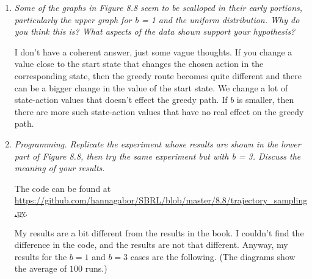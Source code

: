 \documentclass[12pt,a4paper]{article}
\begin{document}
\begin{enumerate}
  \item 
    \textit{Some of the graphs in Figure 8.8 seem to be scalloped in their early portions,
    particularly the upper graph for b = 1 and the uniform distribution. Why do you think
    this is? What aspects of the data shown support your hypothesis?}

    I don't have a coherent answer, just some vague thoughts. If you change a value close to
    the start state that changes the chosen action in the corresponding state, then the greedy
    route becomes quite different and there can be a bigger change in the value of the start
    state. We change a lot of state-action values that doesn't effect the greedy path. If $b$
    is smaller, then there are more such state-action values that have no real effect on the
    greedy path.

  \item
    \textit{Programming. Replicate the experiment whose results are shown in the
    lower part of Figure 8.8, then try the same experiment but with b = 3. Discuss the
    meaning of your results.}

    The code can be found at \url{https://github.com/hannagabor/SBRL/blob/master/8.8/trajectory_sampling.py}.


    My results are a bit different from the results in the book. I couldn't find the difference in the code,
    and the results are not that different. Anyway, my results for the $b = 1$ and $b = 3$
    cases are the following. (The diagrams show the average of $100$ runs.)


\end{enumerate}
\end{document}
